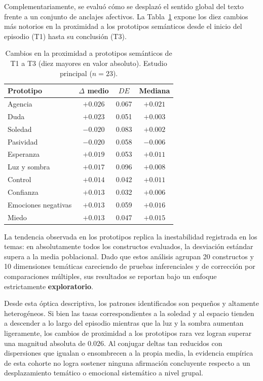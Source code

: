 \documentclass[12pt]{article}
\begin{document}
	Complementariamente, se evaluó cómo se desplazó el sentido global del texto frente a un conjunto de anclajes afectivos. La Tabla~\ref{tab:prototipos_principal} expone los diez cambios más notorios en la proximidad a los prototipos semánticos desde el inicio del episodio (T1) hasta su conclusión (T3).
	
	\begin{table}[htbp]
		\centering
		\caption{Cambios en la proximidad a prototipos semánticos de T1 a T3 (diez mayores en valor absoluto). Estudio principal ($n = 23$).}
		\label{tab:prototipos_principal}
		\begin{tabular}{l c c c}
			\toprule
			Prototipo & $\Delta$ medio & $DE$ & Mediana \\
			\midrule
			Agencia             & $+0.026$ & 0.067 & $+0.021$ \\
			Duda                & $+0.023$ & 0.051 & $+0.003$ \\
			Soledad             & $-0.020$ & 0.083 & $+0.002$ \\
			Pasividad           & $-0.020$ & 0.058 & $-0.006$ \\
			Esperanza           & $+0.019$ & 0.053 & $+0.011$ \\
			Luz y sombra        & $+0.017$ & 0.096 & $+0.008$ \\
			Control             & $+0.014$ & 0.042 & $+0.011$ \\
			Confianza           & $+0.013$ & 0.032 & $+0.006$ \\
			Emociones negativas & $+0.013$ & 0.059 & $+0.016$ \\
			Miedo               & $+0.013$ & 0.047 & $+0.015$ \\
			\bottomrule
		\end{tabular}
	\end{table}
	
	La tendencia observada en los prototipos replica la inestabilidad registrada en los temas: en absolutamente todos los constructos evaluados, la desviación estándar supera a la media poblacional. Dado que estos análisis agrupan 20 constructos y 10 dimensiones temáticas careciendo de pruebas inferenciales y de corrección por comparaciones múltiples, sus resultados se reportan bajo un enfoque estrictamente \textbf{exploratorio}.
	
	Desde esta óptica descriptiva, los patrones identificados son pequeños y altamente heterogéneos. Si bien las tasas correspondientes a la soledad y al espacio tienden a descender a lo largo del episodio mientras que la luz y la sombra aumentan ligeramente, los cambios de proximidad a los prototipos rara vez logran superar una magnitud absoluta de $0.026$. Al conjugar deltas tan reducidos con dispersiones que igualan o ensombrecen a la propia media, la evidencia empírica de esta cohorte no logra sostener ninguna afirmación concluyente respecto a un desplazamiento temático o emocional sistemático a nivel grupal.
	
\end{document}
